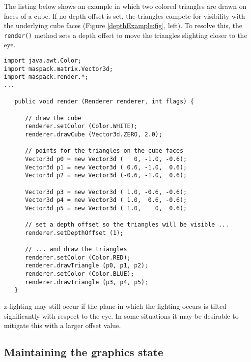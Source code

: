 The listing below shows an example in which two colored triangles are
drawn on faces of a cube. If no depth offset is set, the triangles
compete for visibility with the underlying cube faces (Figure
\ref{depthExample:fig}, left). To resolve this, the {\tt render()}
method sets a depth offset to move the triangles slighting closer to
the eye.
%
\begin{lstlisting}[]
import java.awt.Color;
import maspack.matrix.Vector3d;
import maspack.render.*;
...

   public void render (Renderer renderer, int flags) {
   
      // draw the cube
      renderer.setColor (Color.WHITE);
      renderer.drawCube (Vector3d.ZERO, 2.0);
   
      // points for the triangles on the cube faces
      Vector3d p0 = new Vector3d (   0, -1.0, -0.6);
      Vector3d p1 = new Vector3d ( 0.6, -1.0,  0.6);
      Vector3d p2 = new Vector3d (-0.6, -1.0,  0.6);
   
      Vector3d p3 = new Vector3d ( 1.0, -0.6, -0.6);
      Vector3d p4 = new Vector3d ( 1.0,  0.6, -0.6);
      Vector3d p5 = new Vector3d ( 1.0,    0,  0.6);
   
      // set a depth offset so the triangles will be visible ...
      renderer.setDepthOffset (1);
   
      // ... and draw the triangles
      renderer.setColor (Color.RED);
      renderer.drawTriangle (p0, p1, p2);
      renderer.setColor (Color.BLUE);
      renderer.drawTriangle (p3, p4, p5);
   }
\end{lstlisting}
%
\begin{sideblock}
z-fighting may still occur if the plane in which the fighting occurs
is tilted significantly with respect to the eye.  In some situations
it may be desirable to mitigate this with a larger offset value.
\end{sideblock}

\subsection{Maintaining the graphics state}

